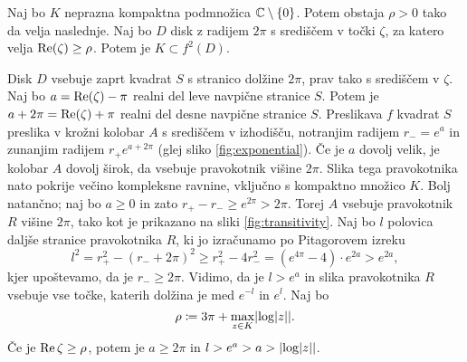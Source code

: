 \begin{trditev} \label{prop:lare_disks}
    Naj bo \(K\) neprazna kompaktna podmnožica \(\mathbb C \setminus \left\{ 0 \right\}\). Potem obstaja \(\rho > 0\) tako da velja naslednje. Naj bo \(D\) disk z radijem \(2 \pi\) s središčem v točki \(\zeta\), za katero velja \(\operatorname{Re} (\zeta) \geq \rho\). Potem je \(K \subset f^2 (D)\).
\end{trditev}

\begin{dokaz}
    Disk \(D\) vsebuje zaprt kvadrat \(S\) s stranico dolžine \(2 \pi\), prav tako s središčem v \(\zeta\). Naj bo \(a = \operatorname{Re} (\zeta) - \pi\) realni del leve navpične stranice \(S\). Potem je \(a + 2 \pi = \operatorname{Re} (\zeta) + \pi\) realni del desne navpične stranice \(S\). Preslikava \(f\) kvadrat \(S\) preslika v krožni kolobar \(A\) s središčem v izhodišču, notranjim radijem \(r_{-} = e^a\) in zunanjim radijem \(r_{+} e^{a + 2 \pi}\) (glej sliko \ref{fig:exponential}).
    Če je \(a\) dovolj velik, je kolobar \(A\) dovolj širok, da vsebuje pravokotnik višine \(2 \pi\). Slika tega pravokotnika nato pokrije večino kompleksne ravnine, vključno s kompaktno množico \(K\). Bolj natančno; naj bo \(a \geq 0\) in zato \(r_+ - r_- \geq e^{2 \pi} > 2 \pi\). Torej \(A\) vsebuje pravokotnik \(R\) višine \(2 \pi\), tako kot je prikazano na sliki \ref{fig:transitivity}.
    Naj bo \(l\) polovica daljše stranice pravokotnika \(R\), ki jo izračunamo po Pitagorovem izreku
    \[l^2 = r_+^2 - (r_- + 2 \pi)^2 \geq r_+^2 - 4 r_-^2 = (e^{4 \pi} - 4) \cdot e^{2 a} > e^{2 a},\]
    kjer upoštevamo, da je \(r_- \geq 2 \pi\). Vidimo, da je \(l > e^a\) in slika pravokotnika \(R\) vsebuje vse točke, katerih dolžina je med \(e^{- l}\) in \(e^l\). Naj bo
    \[\rho \coloneq 3 \pi + \max_{z \in K} \abs{ \log \abs{z} }.\]
    Če je \(\operatorname{Re} \zeta \geq \rho\), potem je \(a \geq 2 \pi\) in \(l > e^a > a > \abs{\log \abs{z}}\).
\end{dokaz}

